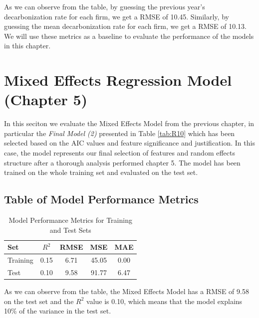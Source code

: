 

\noindent As we can observe from the table, by guessing the previous year's decarbonization rate for each firm, we get a RMSE of 10.45. Similarly, by guessing the mean decarbonization rate for each firm, we get a RMSE of 10.13. We will use these metrics as a baseline to evaluate the performance of the models in this chapter.

\section{Mixed Effects Regression Model (Chapter 5)}
In this seciton we evaluate the Mixed Effects Model from the previous chapter, in particular the \textit{Final Model (2)} presented in Table \ref{tab:R10} which has been selected based on the AIC values and feature significance and justification. In this case, the model represents our final selection of features and random effects structure after a thorough analysis performed chapter 5. The model has been trained on the whole training set and evaluated on the test set.

\subsection{Table of Model Performance Metrics}
\begin{table}[H]
    \centering
    \caption{Model Performance Metrics for Training and Test Sets}
    \label{tab:model_performance}
    \begin{tabular}{lcccc}
    \hline
    Set & $R^2$ & RMSE & MSE & MAE \\ 
    \hline
    Training & 0.15 & 6.71 & 45.05 & 0.00 \\
    Test & 0.10 & 9.58 & 91.77 & 6.47 \\
    \hline
    \end{tabular}
\end{table}    

\noindent As we can observe from the table, the Mixed Effects Model has a RMSE of 9.58 on the test set and the $R^2$ value is 0.10, which means that the model explains 10\% of the variance in the test set. 

